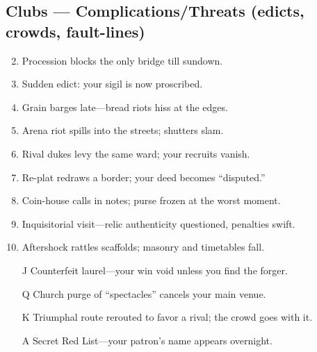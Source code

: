 \subsection*{Clubs --- Complications/Threats (edicts, crowds, fault-lines)}
\label{sec:ecktoria-complications}
\begin{enumerate}
\setcounter{enumi}{1}
\item Procession blocks the only bridge till sundown.
\item Sudden edict: your sigil is now proscribed.
\item Grain barges late---bread riots hiss at the edges.
\item Arena riot spills into the streets; shutters slam.
\item Rival dukes levy the same ward; your recruits vanish.
\item Re-plat redraws a border; your deed becomes ``disputed.''
\item Coin-house calls in notes; purse frozen at the worst moment.
\item Inquisitorial visit---relic authenticity questioned, penalties swift.
\item Aftershock rattles scaffolds; masonry and timetables fall.
\item[J] Counterfeit laurel---your win void unless you find the forger.
\item[Q] Church purge of ``spectacles'' cancels your main venue.
\item[K] Triumphal route rerouted to favor a rival; the crowd goes with it.
\item[A] Secret Red List---your patron's name appears overnight.
\end{enumerate}

